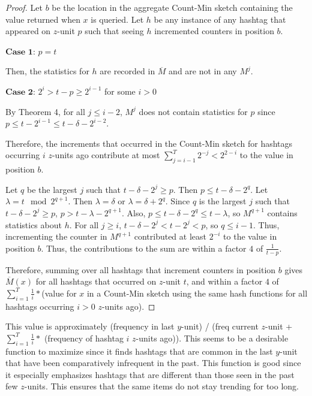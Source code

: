 \documentclass[twoside]{article}
\begin{document}
{\begin{proof}
Let $b$ be the location in the aggregate Count-Min sketch containing the value returned when $x$ is queried.
Let $h$ be any instance of any hashtag that appeared on $z$-unit $p$ such that seeing $h$ incremented counters in position $b$.

\bigskip

\noindent $\textbf{Case 1}$: $p=t$

Then, the statistics for $h$ are recorded in $\overline{M}$ and are not in any $M^j$.

\noindent $\textbf{Case 2}$: $2^i > t-p \geq 2^{i-1}$ for some $i > 0$

By Theorem 4, for all $j \leq i - 2$, $M^j$ does not contain statistics for $p$ since $p \leq t - 2^{i-1} \leq t - \delta - 2^{i-2}$.

\bigskip

Therefore, the increments that occurred in the Count-Min sketch for hashtags occurring $i$ $z$-units ago contribute at most $\sum\limits_{j = i - 1}^{T} 2^{-j} < 2^{2-i}$ to the value in position $b$.

Let $q$ be the largest $j$ such that $t - \delta - 2^j \geq p$.
Then $p \leq t - \delta - 2^q$.  Let $\lambda = t \mod 2^{q+1}$.  Then $\lambda = \delta$ or $\lambda = \delta + 2^q$.
Since $q$ is the largest $j$ such that $t - \delta - 2^j \geq p$, $p > t - \lambda - 2^{q+1}$.
Also, $p \leq t - \delta - 2^q \leq t - \lambda$, so $M^{q+1}$ contains statistics about $h$.
For all $j \geq i$, $t - \delta - 2^j < t - 2^j < p$, so $q \leq i - 1$. 
Thus, incrementing the counter in $M^{q + 1}$ contributed at least $2^{-i}$ to the value in position $b$.
Thus, the contributions to the sum are within a factor $4$ of $\frac{1}{t-p}$.

Therefore, summing over all hashtags that increment counters in position $b$ gives $\overline{M}(x)$ for all hashtags that occurred on $z$-unit $t$, and within a factor $4$ of $\sum\limits_{i=1}^T \frac{1}{i}*$(value for $x$ in a Count-Min sketch using the same hash functions for all hashtags occurring $i > 0$ $z$-units ago). 
\end{proof}
This value is approximately (frequency in last $y$-unit) / (freq current $z$-unit + $\sum\limits_{i=1}^T \frac{1}{i} *$ (frequency of hashtag $i$ $z$-units ago)).
This seems to be a desirable function to maximize since it finds hashtags that are common in the last $y$-unit that have been comparatively infrequent in the past. This function is good since it especially emphasizes hashtags that are different than those seen in the past few $z$-units.  This ensures that the same items do not stay trending for too long. 

}
\end{document}
